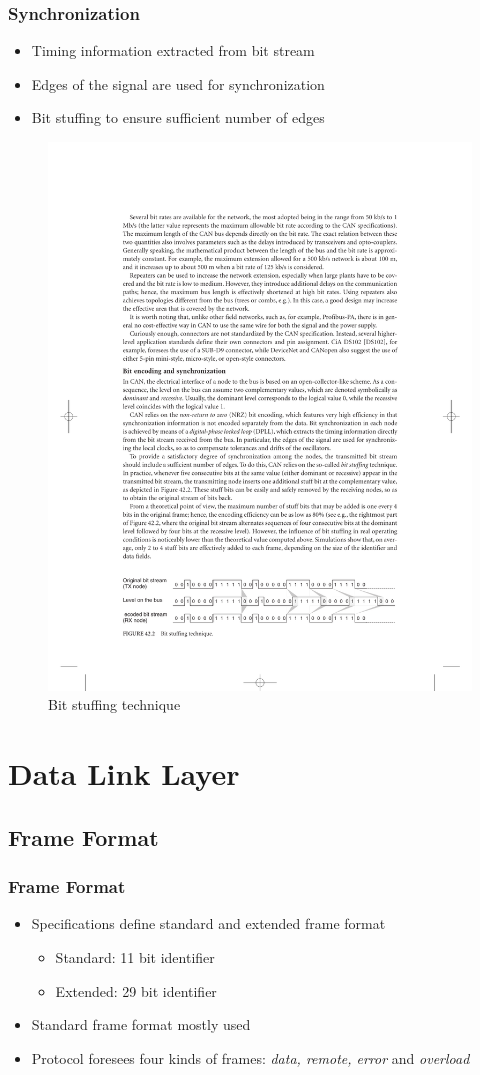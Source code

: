 \documentclass{beamer}
\begin{document}
\begin{frame}
	\frametitle{Synchronization}
	\begin{itemize}
		\item Timing information extracted from bit stream
		\item Edges of the signal are used for synchronization
		\item Bit stuffing to ensure sufficient number of edges
	\end{itemize}
		\begin{figure}
	\includegraphics[width=.6\textwidth]{bitstuffing.pdf} 
\caption{Bit stuffing technique}%
\end{figure}
\end{frame}

\section{Data Link Layer}
\subsection{Frame Format}
\begin{frame}
	\frametitle{Frame Format}
	\begin{itemize}
		\item Specifications define standard and extended frame format
		\begin{itemize}
			\item Standard: 11 bit identifier
			\item Extended: 29 bit identifier
		\end{itemize}
		\item Standard frame format mostly used
		\item Protocol foresees four kinds of frames: \emph{data, remote, error} and \emph{overload}
	\end{itemize}
\end{frame}
\end{document}
